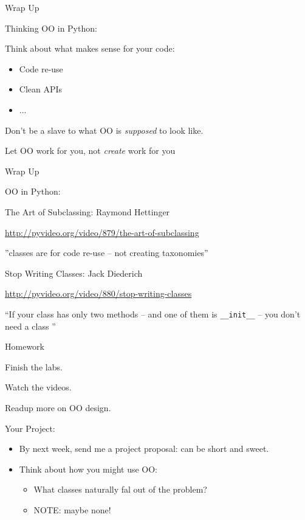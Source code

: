 \documentclass{beamer}
\begin{document}
\begin{frame}[fragile]{Wrap Up}

{\LARGE Thinking OO in Python:}

\vfill
{\large Think about what makes sense for your code:}
\begin{itemize}
  \item {\large Code re-use}
  \item {\large Clean APIs}
  \item {\large ... }
\end{itemize}

\vfill
{\large Don't be a slave to what OO is \emph{supposed} to look like. }

\vfill
{\large Let OO work for you, not \emph{create} work for you}

\end{frame}


\begin{frame}[fragile]{Wrap Up}

{\Large OO in Python:}

\vfill
{\Large The Art of Subclassing}: Raymond Hettinger

\vfill
{\small \url{http://pyvideo.org/video/879/the-art-of-subclassing}}

\vfill
''classes are for code re-use -- not creating taxonomies''

\vfill
{\Large Stop Writing Classes}: Jack Diederich

\vfill
{\small \url{http://pyvideo.org/video/880/stop-writing-classes}}

\vfill
``If your class has only two methods -- and one of them is \verb|__init__|
-- you don't need a class ''
\end{frame}

\begin{frame}[fragile]{Homework}

{\Large Finish the labs.}

\vfill
{\Large Watch the videos.}

\vfill
{\Large Readup more on OO design.}


\vfill
{\LARGE Your Project:}
\begin{itemize}
  \item By next week, send me a project proposal: can be short and sweet.
  \item Think about how you might use OO:
  \begin{itemize}
    \item What classes naturally fal out of the problem?
    \item NOTE: maybe none!
  \end{itemize}
\end{itemize}

\end{frame}
 
\end{document}

